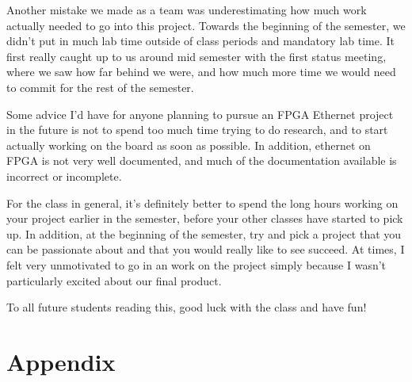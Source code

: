 \documentclass[12pt]{report}
\begin{document}
Another mistake we made as a team was underestimating how much work actually needed to go into this project. Towards the beginning of the semester, we didn't put in much lab time outside of class periods and mandatory lab time. It first really caught up to us around mid semester with the first status meeting, where we saw how far behind we were, and how much more time we would need to commit for the rest of the semester.

Some advice I'd have for anyone planning to pursue an FPGA Ethernet project in the future is not to spend too much time trying to do research, and to start actually working on the board as soon as possible. In addition, ethernet on FPGA is not very well documented, and much of the documentation available is incorrect or incomplete.

For the class in general, it's definitely better to spend the long hours working on your project earlier in the semester, before your other classes have started to pick up. In addition, at the beginning of the semester, try and pick a project that you can be passionate about and that you would really like to see succeed. At times, I felt very unmotivated to go in an work on the project simply because I wasn't particularly excited about our final product.

To all future students reading this, good luck with the class and have fun!
\appendix
\chapter{Appendix}
\end{document}
